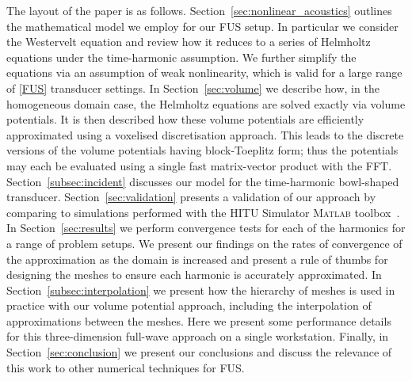\documentclass[preprint]{JASA}
\newcommand{\red}[1]{{\color{red} #1}}
\begin{document}
The layout of the paper is as follows. Section~\ref{sec:nonlinear_acoustics}
outlines the mathematical model we employ for our \red{FUS} setup. In particular we 
consider the Westervelt equation and review how it reduces to a series of Helmholtz 
equations under the time-harmonic assumption. We further simplify the equations
via an assumption of weak nonlinearity, which is valid for a large range
of \ref{FUS} transducer settings. In Section~\ref{sec:volume} we 
describe how, in the homogeneous domain case, the Helmholtz equations are solved 
exactly via volume potentials. It is then described how these volume potentials 
are efficiently approximated using a voxelised discretisation 
approach. This leads to the discrete versions of the volume potentials having 
block-Toeplitz form; thus the potentials may each be evaluated using 
a single fast matrix-vector product with the FFT. Section~\ref{subsec:incident} 
discusses our model for the time-harmonic bowl-shaped transducer.
Section~\ref{sec:validation} 
presents a validation of our approach by comparing to simulations performed 
with the HITU Simulator \textsc{Matlab} toolbox~\cite{HITUwebpage,soneson2017extending}.
In Section~\ref{sec:results} we perform convergence tests for each of the 
harmonics for a range of problem setups. We present our findings on the rates 
of convergence of the approximation as the domain is increased and present a rule 
of thumbs for designing the meshes to ensure each harmonic is accurately 
approximated. In Section~\ref{subsec:interpolation} we present how the hierarchy 
of meshes is used in practice with our volume potential approach, including the 
interpolation of approximations between the meshes. Here we present some performance 
details for this three-dimension full-wave approach on a single workstation.
Finally, in Section~\ref{sec:conclusion} we 
present our conclusions and discuss the relevance of this work to other numerical 
techniques for \red{FUS}.
\end{document}
